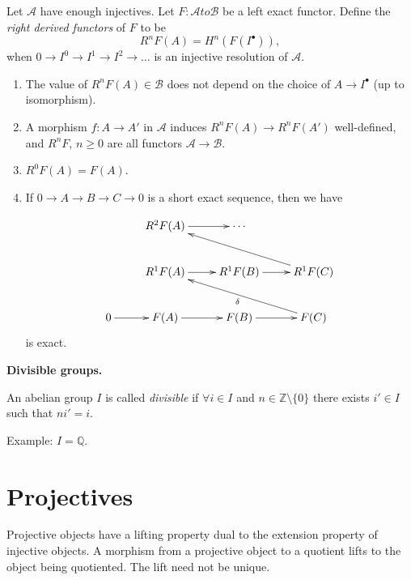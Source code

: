 \begin{definition}
\label{definition-right-derived-functors}
Let $\mathcal{A}$ have enough injectives.
Let $F: \mathcal{A} to \mathcal{B}$ be a
left exact functor.
Define the {\it right derived functors}
of $F$ to be
$$
R^nF(A) = H^n(F(I^\bullet)),
$$
when $0 \to I^0 \to I^1 \to I^2 \to…$
is an injective resolution of $\mathcal{A}$.
\end{definition}

\begin{theorem}
\label{theorem-derived-functors}
\begin{enumerate}
\item The value of $R^nF(A) \in \mathcal{B}$
does not depend on the choice
of $A \to I^\bullet$ (up to isomorphism).

\item A morphism $f:A \to A'$
in $\mathcal{A}$ induces
$R^nF(A) \to R^nF(A')$
well-defined, and $R^nF$,
$n \geq  0$ are all functors
$\mathcal{A} \to \mathcal{B}$.

\item $R^0F(A) = F(A)$.

\item If
$0 \to A \to B \to C \to 0$
is a short exact sequence, then we have

$$
\xymatrix{
&R^2F(A) \ar[r] & \cdots\\
&R^1F(A) \ar[r] & R^1F(B)\ar[r]&R^1F(C)
\ar[ull]\\
0\ar[r] &
F(A)\ar[r]&F(B)\ar[r]&F(C)\ar[ull]^\delta
}
$$
is exact.
\end{enumerate}
\end{theorem}


\medskip\noindent
{\bf Divisible groups.}

\begin{definition}
\label{definition-divisible-group}
An abelian group $I$ is called
{\it divisible} if $\forall i \in I$
and $n \in \mathbb{Z}\setminus\{0\}$
there exists $i' \in I$ such that
$ni'=i$.
\end{definition}

\noindent
Example: $I = \mathbb{Q}$.

\section{Projectives}
\label{section-projectives}

\noindent
Projective objects have a lifting property
dual to the extension property of injective
objects. A morphism from a projective
object to a quotient lifts to the object
being quotiented. The lift need not be
unique.

